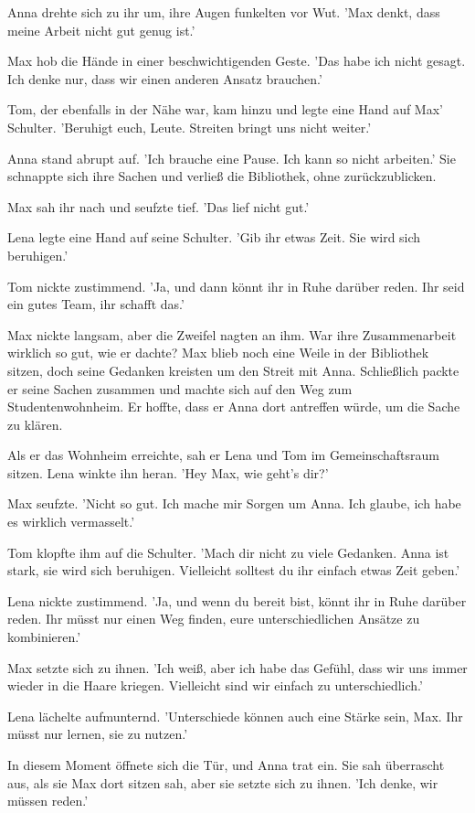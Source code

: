 \documentclass[12pt]{article}
\begin{document}
Anna drehte sich zu ihr um, ihre Augen funkelten vor Wut. 'Max denkt, dass meine Arbeit nicht gut genug ist.'

Max hob die Hände in einer beschwichtigenden Geste. 'Das habe ich nicht gesagt. Ich denke nur, dass wir einen anderen Ansatz brauchen.'

Tom, der ebenfalls in der Nähe war, kam hinzu und legte eine Hand auf Max' Schulter. 'Beruhigt euch, Leute. Streiten bringt uns nicht weiter.'

Anna stand abrupt auf. 'Ich brauche eine Pause. Ich kann so nicht arbeiten.' Sie schnappte sich ihre Sachen und verließ die Bibliothek, ohne zurückzublicken.

Max sah ihr nach und seufzte tief. 'Das lief nicht gut.'

Lena legte eine Hand auf seine Schulter. 'Gib ihr etwas Zeit. Sie wird sich beruhigen.'

Tom nickte zustimmend. 'Ja, und dann könnt ihr in Ruhe darüber reden. Ihr seid ein gutes Team, ihr schafft das.'

Max nickte langsam, aber die Zweifel nagten an ihm. War ihre Zusammenarbeit wirklich so gut, wie er dachte? Max blieb noch eine Weile in der Bibliothek sitzen, doch seine Gedanken kreisten um den Streit mit Anna. Schließlich packte er seine Sachen zusammen und machte sich auf den Weg zum Studentenwohnheim. Er hoffte, dass er Anna dort antreffen würde, um die Sache zu klären.

Als er das Wohnheim erreichte, sah er Lena und Tom im Gemeinschaftsraum sitzen. Lena winkte ihn heran. 'Hey Max, wie geht's dir?'

Max seufzte. 'Nicht so gut. Ich mache mir Sorgen um Anna. Ich glaube, ich habe es wirklich vermasselt.'

Tom klopfte ihm auf die Schulter. 'Mach dir nicht zu viele Gedanken. Anna ist stark, sie wird sich beruhigen. Vielleicht solltest du ihr einfach etwas Zeit geben.'

Lena nickte zustimmend. 'Ja, und wenn du bereit bist, könnt ihr in Ruhe darüber reden. Ihr müsst nur einen Weg finden, eure unterschiedlichen Ansätze zu kombinieren.'

Max setzte sich zu ihnen. 'Ich weiß, aber ich habe das Gefühl, dass wir uns immer wieder in die Haare kriegen. Vielleicht sind wir einfach zu unterschiedlich.'

Lena lächelte aufmunternd. 'Unterschiede können auch eine Stärke sein, Max. Ihr müsst nur lernen, sie zu nutzen.'

In diesem Moment öffnete sich die Tür, und Anna trat ein. Sie sah überrascht aus, als sie Max dort sitzen sah, aber sie setzte sich zu ihnen. 'Ich denke, wir müssen reden.'
\end{document}
